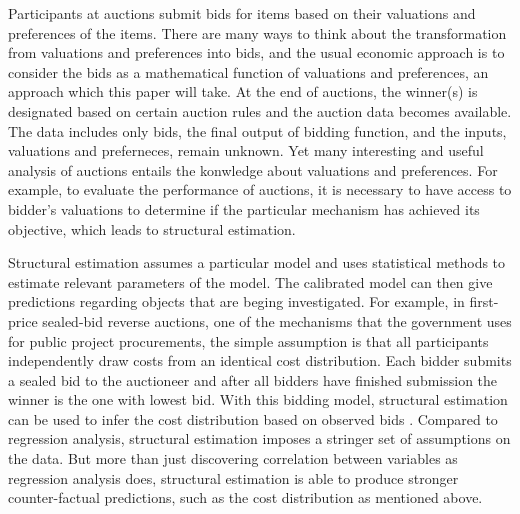 \documentclass[11pt]{article}
\begin{document}



Participants at auctions submit bids for items based on their valuations and 
preferences of the items. There are many ways to think about the transformation from 
valuations and preferences into bids, and the usual economic approach is to consider 
the bids as a mathematical function of valuations and preferences, an approach which 
this paper will take. At the end of auctions, the winner(s) 
is designated based on certain auction rules and the auction data becomes available.
The data includes only bids, the final output of bidding function, and the inputs, 
valuations and preferneces, remain unknown. Yet many interesting and useful analysis 
of auctions entails the konwledge about valuations and preferences. For example, 
to evaluate the performance of auctions, it is necessary to have access to bidder's 
valuations to determine if the particular mechanism has achieved its objective,
which leads to structural estimation. 

Structural estimation assumes a particular model and uses statistical methods to 
estimate relevant parameters of the model. The calibrated model can then 
give predictions regarding objects that are beging investigated. For example, 
in first-price sealed-bid reverse auctions, 
one of the mechanisms that the government uses for public project procurements, 
the simple assumption is that all participants independently draw costs from an 
identical cost distribution. 
Each bidder submits a sealed bid to the auctioneer and after all bidders have finished 
submission the winner is the one with lowest bid. With this bidding model, 
structural estimation can be used 
to infer the cost distribution based on observed bids \cite{Guerreetal2000}.
Compared to regression analysis, structural estimation imposes a stringer set of 
assumptions on the data. But more than just discovering correlation between variables 
as regression analysis does, structural estimation is able to produce stronger 
counter-factual predictions, such as the cost distribution as mentioned above. 
\end{document}
